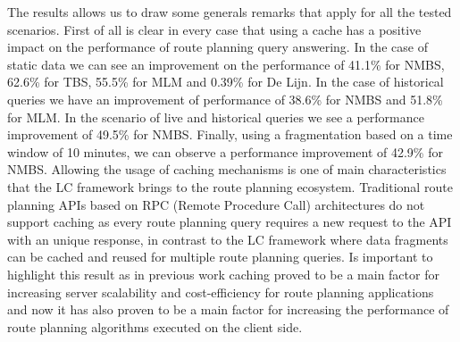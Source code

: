 \documentclass[sw]{iosart2x}
\begin{document}
	The results allows us to draw some generals remarks that apply for all the tested scenarios. First of all is clear in every case that using a cache has a positive impact on the performance of route planning query answering. In the case of static data we can see an improvement on the performance of 41.1\% for NMBS, 62.6\% for TBS, 55.5\% for MLM and 0.39\% for De Lijn. In the case of historical queries we have an improvement of performance of 38.6\% for NMBS and 51.8\% for MLM. In the scenario of live and historical queries we see a performance improvement of 49.5\% for NMBS. Finally, using a fragmentation based on a time window of 10 minutes, we can observe a performance improvement of 42.9\% for NMBS. Allowing the usage of caching mechanisms is one of main characteristics that the LC framework brings to the route planning ecosystem. Traditional route planning APIs based on RPC (Remote Procedure Call) architectures do not support caching as every route planning query requires a new request to the API with an unique response, in contrast to the LC framework where data fragments can be cached and reused for multiple route planning queries. Is important to highlight this result as in previous work caching proved to be a main factor for increasing server scalability and cost-efficiency for route planning applications~\cite{colpaert2017public} and now it has also proven to be a main factor for increasing the performance of route planning algorithms executed on the client side.
	
\end{document}
